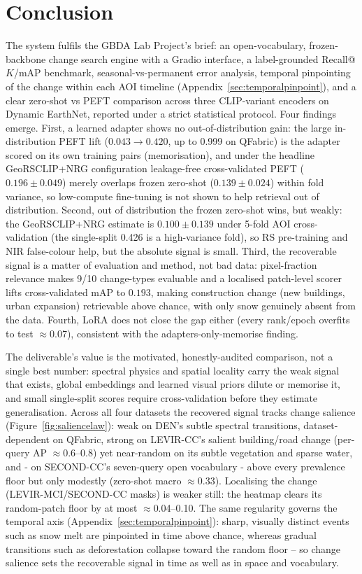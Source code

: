 \documentclass{article}
\begin{document}
\section{Conclusion}
\label{sec:conclusion}

The system fulfils the GBDA Lab Project's brief: an open-vocabulary, frozen-backbone change
search engine with a Gradio interface, a label-grounded Recall@$K$/mAP benchmark,
seasonal-vs-permanent error analysis, temporal pinpointing of the change within each
AOI timeline (Appendix~\ref{sec:temporalpinpoint}), and a clear zero-shot vs PEFT
comparison across three CLIP-variant encoders on Dynamic EarthNet, reported under a
strict statistical protocol. Four findings emerge. First, a learned adapter shows no
out-of-distribution gain: the large in-distribution PEFT lift
($0.043 \rightarrow 0.420$, up to 0.999 on QFabric) is the adapter scored on its
own training pairs (memorisation), and under the headline GeoRSCLIP+NRG
configuration leakage-free cross-validated PEFT ($0.196 \pm 0.049$) merely
overlaps frozen zero-shot ($0.139 \pm 0.024$) within fold variance, so low-compute
fine-tuning is not shown to help retrieval out of distribution. Second, out of
distribution the frozen zero-shot wins, but weakly: the GeoRSCLIP+NRG estimate is
$0.100 \pm 0.139$ under 5-fold AOI cross-validation (the single-split 0.426 is a
high-variance fold), so RS pre-training and NIR false-colour help, but the
absolute signal is small. Third, the recoverable signal is a matter of evaluation
and method, not bad data: pixel-fraction relevance makes 9/10 change-types
evaluable and a localised patch-level scorer lifts cross-validated mAP to
$0.193$, making construction change (new buildings, urban expansion) retrievable
above chance, with only snow genuinely absent from the data. Fourth, LoRA does
not close the gap either (every rank/epoch overfits to test $\approx$0.07),
consistent with the adapters-only-memorise finding.

The deliverable's value is the motivated, honestly-audited comparison, not a
single best number: spectral physics and spatial locality carry the weak signal
that exists, global embeddings and learned visual priors dilute or memorise it,
and small single-split scores require cross-validation before they estimate
generalisation. Across all four datasets the recovered signal tracks change
salience (Figure~\ref{fig:saliencelaw}): weak on DEN's subtle spectral
transitions, dataset-dependent on QFabric, strong on LEVIR-CC's salient
building/road change (per-query AP $\approx$0.6--0.8) yet near-random on its
subtle vegetation and sparse water, and - on SECOND-CC's seven-query open
vocabulary - above every prevalence floor but only modestly (zero-shot macro
$\approx$0.33). Localising the change (LEVIR-MCI/SECOND-CC masks) is weaker still:
the heatmap clears its random-patch floor by at most $\approx$0.04--0.10. The same
regularity governs the temporal axis (Appendix~\ref{sec:temporalpinpoint}): sharp,
visually distinct events such as snow melt are pinpointed in time above chance,
whereas gradual transitions such as deforestation collapse toward the random
floor -- so change salience sets the recoverable signal in time as well as in
space and vocabulary.
\end{document}
